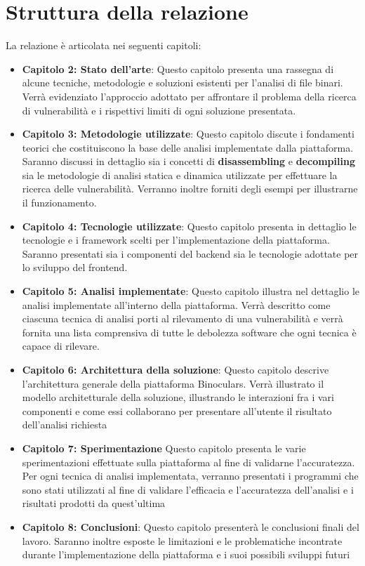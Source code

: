 \documentclass[../main.tex]{subfiles}
\begin{document}
\section{Struttura della relazione}
La relazione è articolata nei seguenti capitoli:
\begin{itemize}
    \item \textbf{Capitolo 2: Stato dell'arte}: Questo capitolo presenta una rassegna di alcune tecniche, metodologie e soluzioni esistenti per l'analisi di file binari. Verrà evidenziato l'approccio adottato per affrontare il problema della ricerca di vulnerabilità e i
    rispettivi limiti di ogni soluzione presentata.
    \item \textbf{Capitolo 3: Metodologie utilizzate}: Questo capitolo discute i fondamenti teorici che costituiscono la base delle analisi implementate dalla piattaforma. Saranno discussi in dettaglio sia i concetti di \textbf{disassembling} e \textbf{decompiling} sia
    le metodologie di analisi statica e dinamica utilizzate per effettuare la ricerca delle vulnerabilità. Verranno inoltre forniti degli esempi per illustrarne il funzionamento.
    \item \textbf{Capitolo 4: Tecnologie utilizzate}: Questo capitolo presenta in dettaglio le tecnologie e i framework scelti per l'implementazione della piattaforma. Saranno presentati sia i componenti del backend sia le tecnologie adottate per lo sviluppo del frontend.
    \item \textbf{Capitolo 5: Analisi implementate}: Questo capitolo illustra nel dettaglio le analisi implementate all'interno della piattaforma. Verrà descritto come ciascuna tecnica di analisi porti al rilevamento di una vulnerabilità e verrà fornita una lista comprensiva di tutte le debolezza software che ogni tecnica è capace di rilevare.
    \item \textbf{Capitolo 6: Architettura della soluzione}: Questo capitolo descrive l'architettura generale della piattaforma Binoculars. Verrà illustrato il modello architetturale della soluzione, illustrando le interazioni fra i vari componenti e come essi collaborano per presentare all'utente il risultato dell'analisi richiesta    
    \item \textbf{Capitolo 7: Sperimentazione} Questo capitolo presenta le varie sperimentazioni effettuate sulla piattaforma al fine di validarne l'accuratezza. Per ogni tecnica di analisi implementata, verranno presentati i programmi che sono stati utilizzati al fine di validare l'efficacia e l'accuratezza dell'analisi e i risultati prodotti da quest'ultima 
    \item \textbf{Capitolo 8: Conclusioni}: Questo capitolo presenterà le conclusioni finali del lavoro. Saranno inoltre esposte le limitazioni e le problematiche incontrate durante l'implementazione della piattaforma e i suoi possibili sviluppi futuri
\end{itemize}
\end{document}

